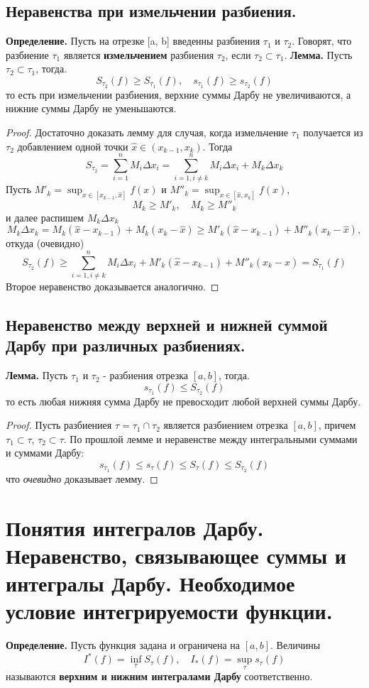 \documentclass{article}
\newcommand*{\lemma}[1]{\textbf{Лемма.} #1. \newline}
\newcommand*{\definition}[1]{\textbf{Определение.} #1 \newline}
\begin{document}
\subsection{Неравенства при измельчении разбиения.}
\definition{Пусть на отрезке [a, b] введенны разбиения $\tau_1$ и $\tau_2$. Говорят, что разбиение $\tau_1$ является \textbf{измельчением} разбиения $\tau_2$, если $\tau_2 \subset \tau_1$.}
\newline 
\lemma{Пусть $\tau_2 \subset \tau_1$, тогда}
$$
    S_{\tau_2}(f) \geq S_{\tau_1}(f), \quad s_{\tau_1}(f) \geq s_{\tau_2}(f)
$$
то есть при измельчении разбиения, верхние суммы Дарбу не увеличиваются, а нижние суммы Дарбу не уменьшаются.
\begin{proof}
    Достаточно доказать лемму для случая, когда измельчение $\tau_1$ получается из $\tau_2$ добавлением одной точки $\hat{x} \in (x_{k-1}, x_k)$. Тогда
    $$
        S_{\tau_2} = \sum_{i = 1}^{n} M_i \Delta x_i = \sum_{i = 1, i \neq k}^{n}M_i \Delta x_i + M_k \Delta x_k
    $$
    Пусть $M'_k = \displaystyle \sup_{x \in [x_{k-1}, \hat{x}]}f(x)$ и $M''_k = \displaystyle \sup_{x \in [\hat{x}, x_k]}f(x)$,
    $$  
        M_k \geq M'_k, \quad M_k \geq M''_k
    $$
    и далее распишем $M_k \Delta x_k$
    $$
        M_k \Delta x_k = M_k(\hat{x} - x_{k - 1}) + M_k(x_k - \hat{x}) \geq M'_k(\hat{x} - x_{k - 1}) + M''_k(x_k - \hat{x}),
    $$
    откуда (очевидно)
    $$
        S_{\tau_2}(f) \geq \sum_{i = 1, i \neq k}^{n} M_i \Delta x_i + M'_k(\hat{x} - x_{k - 1}) + M''_k(x_k - \hat{x}) = S_{\tau_1}(f)
    $$
    Второе неравенство доказывается аналогично.
\end{proof}
\subsection{Неравенство между верхней и нижней суммой Дарбу при различных разбиениях.}
\lemma{Пусть $\tau_1$ и $\tau_2$ - разбиения отрезка $[a, b]$, тогда}
$$
    s_{\tau_1}(f) \leq S_{\tau_2}(f)
$$
то есть любая нижняя сумма Дарбу не превосходит любой верхней суммы Дарбу.
\begin{proof}
    Пусть разбиениея $\tau = \tau_1 \cap \tau_2$ является разбиением отрезка $[a, b]$, причем $\tau_1 \subset \tau$, $\tau_2 \subset \tau$. По прошлой лемме и неравенстве между интегральными суммами и суммами Дарбу:
    $$
        s_{\tau_1}(f) \leq s_\tau(f) \leq S_\tau(f) \leq S_{\tau_2}(f)
    $$
    что \textit{очевидно} доказывает лемму.
\end{proof}
\section{Понятия интегралов Дарбу. Неравенство, связывающее суммы и интегралы Дарбу. Необходимое условие интегрируемости функции.}
\definition{Пусть функция задана и ограничена на $[a, b]$. Величины}
$$
    I^*(f) = \displaystyle \inf_{\tau}S_\tau(f), \quad I_*(f) = \sup_{\tau}s_\tau(f) 
$$
называются \textbf{верхним и нижним интегралами Дарбу} соответственно.
\end{document}
